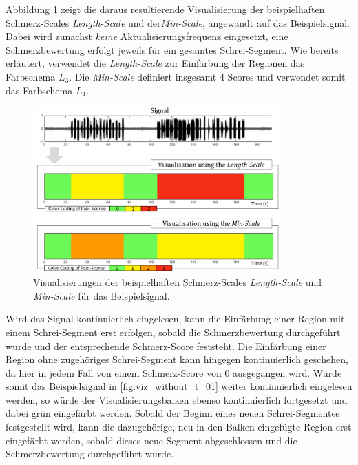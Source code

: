 Abbildung \ref{fig:viz_without_t_01} zeigt die daraus resultierende Visualisierung der beispielhaften Schmerz-Scales \emph{Length-Scale} und der\emph{Min-Scale}, angewandt auf das Beispielsignal. Dabei wird zunächst \emph{keine} Aktualisierungsfrequenz eingesetzt, eine Schmerzbewertung erfolgt jeweils für ein gesamtes Schrei-Segment. Wie bereits erläutert, verwendet die \emph{Length-Scale} zur Einfärbung der Regionen das Farbschema $L_3$. Die \emph{Min-Scale} definiert insgesamt 4 Scores und verwendet somit das Farbschema $L_4$.

\begin{figure}[h]
	\centering
	\includegraphics[width=0.85\textwidth]{bilder/viz_without_t_06.png}
	\caption[Visualisierungen der beispielhaften Schmerz-Scales durch schematische Balken]{Visualisierungen der beispielhaften Schmerz-Scales \emph{Length-Scale} und \emph{Min-Scale} für das Beispielsignal.}
	\label{fig:viz_without_t_01}
\end{figure}

Wird das Signal kontinuierlich eingelesen, kann die Einfärbung einer Region mit einem Schrei-Segment erst erfolgen, sobald die Schmerzbewertung durchgeführt wurde und der entsprechende Schmerz-Score feststeht. Die Einfärbung einer Region ohne zugehöriges Schrei-Segment kann hingegen kontinuierlich geschehen, da hier in jedem Fall von einem Schmerz-Score von 0 ausgegangen wird. Würde somit das Beispielsignal in \autoref{fig:viz_without_t_01} weiter kontinuierlich eingelesen werden, so würde der Visualisierungsbalken ebenso kontinuierlich fortgesetzt und dabei grün eingefärbt werden. Sobald der Beginn eines neuen Schrei-Segmentes festgestellt wird, kann die dazugehörige, neu in den Balken eingefügte Region erst eingefärbt werden, sobald dieses neue Segment abgeschlossen und die Schmerzbewertung durchgeführt wurde.

